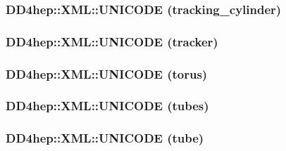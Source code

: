 \label{namespace_d_d4hep_1_1_x_m_l_ab293b8cea7878daa0cdfaefe143e05e5}
\hypertarget{namespace_d_d4hep_1_1_x_m_l_a89f1fb0984e2823132240fb9d3520b21}{
\subsubsection[{UNICODE}]{\setlength{\rightskip}{0pt plus 5cm}DD4hep::XML::UNICODE (tracking\_\-cylinder)}}
\label{namespace_d_d4hep_1_1_x_m_l_a89f1fb0984e2823132240fb9d3520b21}
\hypertarget{namespace_d_d4hep_1_1_x_m_l_a34e397188bc5912d25b3e61a232bed57}{
\subsubsection[{UNICODE}]{\setlength{\rightskip}{0pt plus 5cm}DD4hep::XML::UNICODE (tracker)}}
\label{namespace_d_d4hep_1_1_x_m_l_a34e397188bc5912d25b3e61a232bed57}
\hypertarget{namespace_d_d4hep_1_1_x_m_l_ade929897d75b8e68deb204d4169fd7d1}{
\subsubsection[{UNICODE}]{\setlength{\rightskip}{0pt plus 5cm}DD4hep::XML::UNICODE (torus)}}
\label{namespace_d_d4hep_1_1_x_m_l_ade929897d75b8e68deb204d4169fd7d1}
\hypertarget{namespace_d_d4hep_1_1_x_m_l_a80b1b709eb536f9107a7c7297b702c80}{
\subsubsection[{UNICODE}]{\setlength{\rightskip}{0pt plus 5cm}DD4hep::XML::UNICODE (tubes)}}
\label{namespace_d_d4hep_1_1_x_m_l_a80b1b709eb536f9107a7c7297b702c80}
\hypertarget{namespace_d_d4hep_1_1_x_m_l_a59d5c1db0e628670901c0aff664eb5c1}{
\subsubsection[{UNICODE}]{\setlength{\rightskip}{0pt plus 5cm}DD4hep::XML::UNICODE (tube)}}
\label{namespace_d_d4hep_1_1_x_m_l_a59d5c1db0e628670901c0aff664eb5c1}

